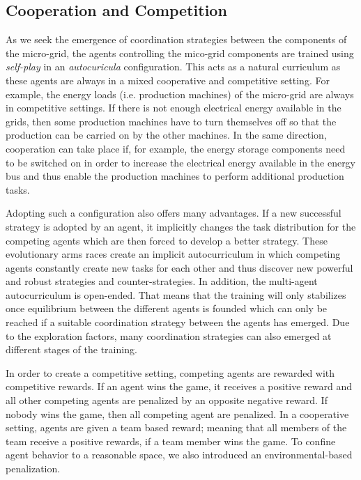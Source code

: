 \subsection{Cooperation and Competition}
\label{subsec:42}
As we seek the emergence of coordination strategies between the components of the micro-grid, the agents controlling the mico-grid components are trained using \textit{self-play} in an \textit{autocuricula} configuration. This acts as a natural curriculum as these agents are always in a mixed cooperative and competitive setting. For example, the energy loads (i.e. production machines) of the micro-grid are always in competitive settings. If there is not enough electrical energy available in the grids, then some production machines have to turn themselves off so that the production can be carried on by the other machines. In the same direction, cooperation can take place if, for example, the energy storage components need to be switched on in order to increase the electrical energy available in the energy bus and thus enable the production machines to perform additional production tasks.

Adopting such a configuration also offers many advantages. If a new successful strategy is adopted by an agent, it implicitly changes the task distribution for the competing agents which are then forced to develop a better strategy. These evolutionary arms races create an implicit autocurriculum in which competing agents constantly create new tasks for each other and thus discover new powerful and robust strategies and counter-strategies. In addition, the multi-agent autocurriculum is open-ended. That means that the training will only stabilizes once equilibrium between the different agents is founded which can only be reached if a suitable coordination strategy between the agents has emerged. Due to the exploration factors, many coordination strategies can also emerged at different stages of the training.

In order to create a competitive setting, competing agents are rewarded with competitive rewards. If an agent wins the game, it receives a positive reward and all other competing agents are penalized by an opposite negative reward. If nobody wins the game, then all competing agent are penalized. In a cooperative setting, agents are given a team based reward; meaning that all members of the team receive a positive rewards, if a team member wins the game. To confine agent behavior to a reasonable space, we also introduced an environmental-based penalization.

